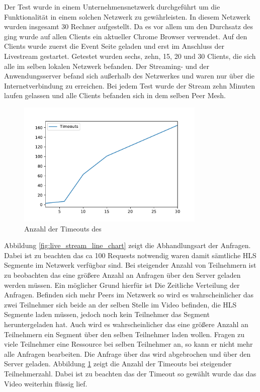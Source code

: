 Der Test wurde in einem Unternehmensnetzwerk durchgeführt um die Funktionalität in einem solchen Netzwerk zu gewährleisten. In diesem Netzwerk wurden insgesamt 30 Rechner aufgestellt. Da es vor allem um den Durchsatz des \cdns ging wurde auf allen Clients ein aktueller Chrome Browser verwendet. Auf den Clients wurde zuerst die Event Seite geladen und erst im Anschluss der Livestream gestartet. Getestet wurden sechs, zehn, 15, 20 und 30 Clients, die sich alle im selben lokalen Netzwerk befanden. Der Streaming- und der Anwendungsserver befand sich außerhalb des Netzwerkes und waren nur über die Internetverbindung zu erreichen. Bei jedem Test wurde der Stream zehn Minuten laufen gelassen und alle Clients befanden sich in dem selben Peer Mesh.

\begin{figure}[!h]
	\centering
	\includegraphics[width=0.8\textwidth]{figures/timeouts}
	\caption[A Figure Short-Title]{Anzahl der Timeouts des \cdns}
	\label{fig:timeouts}
\end{figure}


Abbildung \ref{fig:live_stream_line_chart} zeigt die Abhandlungsart der Anfragen. Dabei ist zu beachten das ca 100 Requests notwendig waren damit sämtliche HLS Segmente im \pTp Netzwerk verfügbar sind. Bei steigender Anzahl von Teilnehmern ist zu beobachten das eine größere Anzahl an Anfragen über den Server geladen werden müssen. Ein möglicher Grund hierfür ist Die Zeitliche Verteilung der Anfragen. Befinden sich mehr Peers im Netzwerk so wird es wahrscheinlicher das zwei Teilnehmer sich beide an der selben Stelle im Video befinden, die HLS Segmente laden müssen, jedoch noch kein Teilnehmer das Segment heruntergeladen hat. Auch wird es wahrscheinlicher das eine größere Anzahl an Teilnehmern ein Segment über den selben Teilnehmer laden wollen. Fragen zu viele Teilnehmer eine Ressource bei selben Teilnehmer an, so kann er nicht mehr alle Anfragen bearbeiten. Die Anfrage über das \pTp \cdn wird abgebrochen und über den Server geladen. Abbildung \ref{fig:timeouts} zeigt die Anzahl der Timeouts bei steigender Teilnehmerzahl. Dabei ist zu beachten das der Timeout so gewählt wurde das das Video weiterhin flüssig lief.


